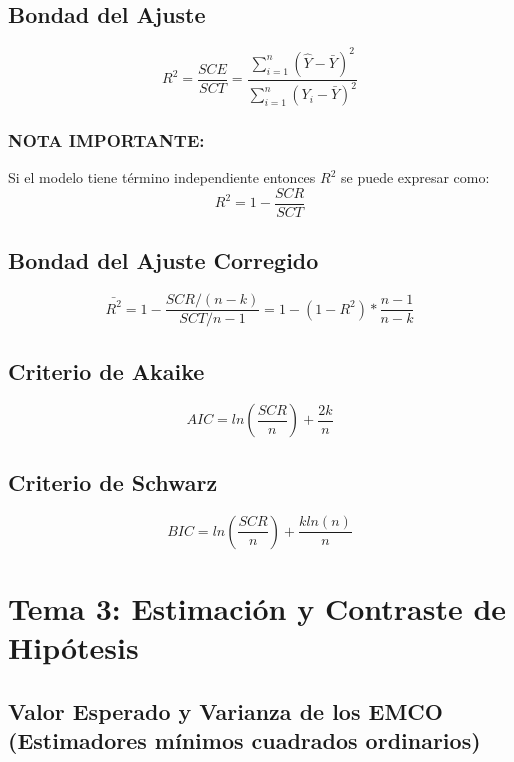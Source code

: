 \documentclass[a4paper,12pt]{article}
\begin{document}
\subsection{Bondad del Ajuste}

\begin{equation}
    R^2 = \frac{SCE}{SCT} = \frac{\sum_{i=1}^n(\hat{Y}-\bar{Y})^2}{\sum_{i=1}^n(Y_i-\bar{Y})^2}
\end{equation}

\subsubsection*{NOTA IMPORTANTE:}
Si el modelo tiene término independiente entonces $R^2$ se puede expresar como:
\begin{equation}
    R^2 = 1 - \frac{SCR}{SCT}
\end{equation}

\subsection{Bondad del Ajuste Corregido}

\begin{equation}
    \bar{R^2} = 1- \frac{SCR/(n-k)}{SCT/n-1} = 1-(1-R^2) * \frac{n-1}{n-k}
\end{equation}


\subsection{Criterio de Akaike}
\begin{equation}
    AIC = ln(\frac{SCR}{n}) + \frac{2k}{n}
\end{equation}

\subsection{Criterio de Schwarz}
\begin{equation}
    BIC = ln(\frac{SCR}{n}) + \frac{kln(n)}{n}
\end{equation}

\section{Tema 3: Estimación y Contraste de Hipótesis}


\subsection{Valor Esperado y Varianza de los EMCO (Estimadores mínimos cuadrados ordinarios)}
\end{document}
